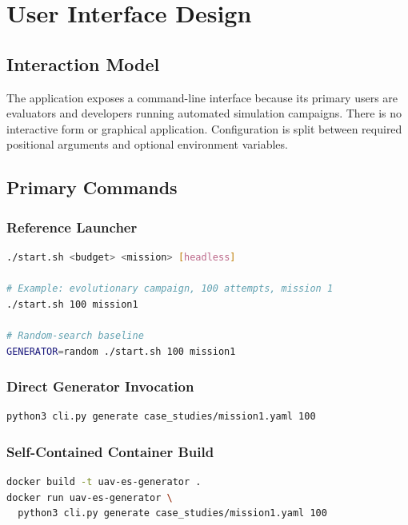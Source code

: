 \documentclass[11pt,a4paper]{report}
\begin{document}
\chapter{User Interface Design}

\section{Interaction Model}
The application exposes a command-line interface because its primary users are evaluators and developers running automated simulation campaigns. There is no interactive form or graphical application. Configuration is split between required positional arguments and optional environment variables.

\section{Primary Commands}
\subsection{Reference Launcher}
\begin{lstlisting}[language=bash]
./start.sh <budget> <mission> [headless]

# Example: evolutionary campaign, 100 attempts, mission 1
./start.sh 100 mission1

# Random-search baseline
GENERATOR=random ./start.sh 100 mission1
\end{lstlisting}

\subsection{Direct Generator Invocation}
\begin{lstlisting}[language=bash]
python3 cli.py generate case_studies/mission1.yaml 100
\end{lstlisting}

\subsection{Self-Contained Container Build}
\begin{lstlisting}[language=bash]
docker build -t uav-es-generator .
docker run uav-es-generator \
  python3 cli.py generate case_studies/mission1.yaml 100
\end{lstlisting}
\end{document}
